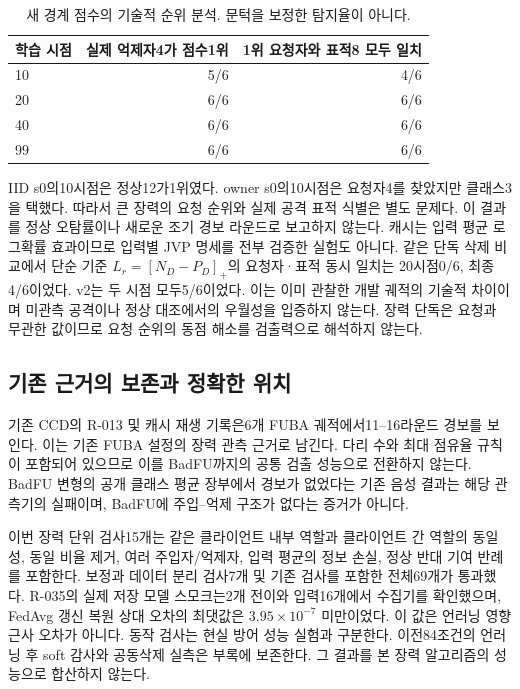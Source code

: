 \documentclass[10pt,a4paper]{article}
\begin{document}
\begin{table}[ht]\centering\small
\caption{새 경계 점수의 기술적 순위 분석. 문턱을 보정한 탐지율이 아니다.}
\begin{tabular}{lrr}\toprule
학습 시점 & 실제 억제자4가 점수1위 & 1위 요청자와 표적8 모두 일치\\\midrule
10 & 5/6 & 4/6\\
20 & 6/6 & 6/6\\
40 & 6/6 & 6/6\\
99 & 6/6 & 6/6\\\bottomrule
\end{tabular}
\end{table}
IID s0의10시점은 정상12가1위였다.
owner s0의10시점은 요청자4를 찾았지만 클래스3을 택했다.
따라서 큰 장력의 요청 순위와 실제 공격 표적 식별은 별도 문제다.
이 결과를 정상 오탐률이나 새로운 조기 경보 라운드로 보고하지 않는다.
캐시는 입력 평균 로그확률 효과이므로 입력별 JVP 명세를 전부 검증한 실험도 아니다.
같은 단독 삭제 비교에서 단순 기준 $L_r=[N_D-P_D]_+$의 요청자·표적 동시 일치는
20시점0/6, 최종4/6이었다. v2는 두 시점 모두5/6이었다.
이는 이미 관찰한 개발 궤적의 기술적 차이이며 미관측 공격이나 정상 대조에서의 우월성을 입증하지 않는다.
장력 단독은 요청과 무관한 값이므로 요청 순위의 동점 해소를 검출력으로 해석하지 않는다.

\subsection{기존 근거의 보존과 정확한 위치}
기존 CCD의 R-013 및 캐시 재생 기록은6개 FUBA 궤적에서11--16라운드 경보를 보인다.
이는 기존 FUBA 설정의 장력 관측 근거로 남긴다.
다리 수와 최대 점유율 규칙이 포함되어 있으므로 이를 BadFU까지의 공통 검출 성능으로 전환하지 않는다.
BadFU 변형의 공개 클래스 평균 장부에서 경보가 없었다는 기존 음성 결과는
해당 관측기의 실패이며, BadFU에 주입--억제 구조가 없다는 증거가 아니다.

이번 장력 단위 검사15개는 같은 클라이언트 내부 역할과 클라이언트 간 역할의 동일성,
동일 비율 제거, 여러 주입자/억제자, 입력 평균의 정보 손실, 정상 반대 기여 반례를 포함한다.
보정과 데이터 분리 검사7개 및 기존 검사를 포함한 전체69개가 통과했다.
R-035의 실제 저장 모델 스모크는2개 전이와 입력16개에서 수집기를 확인했으며,
FedAvg 갱신 복원 상대 오차의 최댓값은 $3.95\times10^{-7}$ 미만이었다.
이 값은 언러닝 영향 근사 오차가 아니다. 동작 검사는 현실 방어 성능 실험과 구분한다.
이전84조건의 언러닝 후 soft 감사와 공동삭제 실측은 부록에 보존한다.
그 결과를 본 장력 알고리즘의 성능으로 합산하지 않는다.
\end{document}
